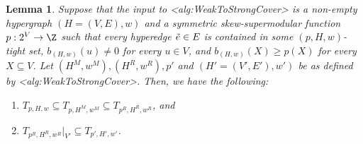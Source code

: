\documentclass{article}
\def\Cref#1{<#1>}%
\newtheorem{lemma}{Lemma}[section]
\newcommand{\tightSetFamily}[1]{\ensuremath{T_{#1}}\xspace}
\newcommand{\maximalTightSetContainingHyperedge}[1]{\ensuremath{\tau_{#1}}\xspace}
\begin{document}
\begin{lemma}\label{lem:WeakToStrongCover:TightSetFamiliesDuringAlgorithm}
Suppose that the input to \Cref{alg:WeakToStrongCover} is a non-empty hypergraph $(H = (V, E), w)$ and a symmetric skew-supermodular function $p:2^V\rightarrow \Z$ %
such that every hyperedge $\Tilde{e} \in E$ is contained in some $(p, H, w)$-tight set, $b_{(H,w)}(u) \not = 0$ for every $u \in V$, and $b_{(H,w)}(X) \geq p(X)$ for every $X \subseteq V$. 
Let $(H^M, w^M), (H^R, w^R), p'$ 
and $(H' = (V', E'), w')$ be as defined by \Cref{alg:WeakToStrongCover}.
Then, we have the following:
     \begin{enumerate}
        \item $\tightSetFamily{p, H, w} \subseteq \tightSetFamily{p, H^M, w^M} \subseteq \tightSetFamily{p^R, H^R, w^R}$, and 
        \item $\tightSetFamily{p^R, H^R, w^R}|_{V'} \subseteq \tightSetFamily{p', H', w'}$.
    \end{enumerate}
\end{lemma}
\end{document}
